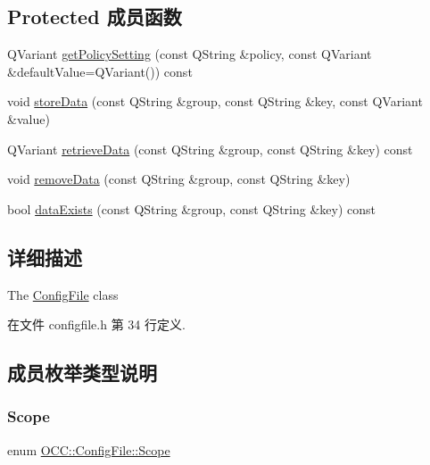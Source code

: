 \subsection*{Protected 成员函数}
\begin{DoxyCompactItemize}
\item 
Q\+Variant \hyperlink{class_o_c_c_1_1_config_file_ab8458ef4cde677e7d08c95291a15c00d}{get\+Policy\+Setting} (const Q\+String \&policy, const Q\+Variant \&default\+Value=Q\+Variant()) const
\item 
void \hyperlink{class_o_c_c_1_1_config_file_a0e1558affc0349e785270dfd04b49a89}{store\+Data} (const Q\+String \&group, const Q\+String \&key, const Q\+Variant \&value)
\item 
Q\+Variant \hyperlink{class_o_c_c_1_1_config_file_a578b6354af7268fcf3f552574d848cbd}{retrieve\+Data} (const Q\+String \&group, const Q\+String \&key) const
\item 
void \hyperlink{class_o_c_c_1_1_config_file_a24117f4ec9d4387901c0222478fe6584}{remove\+Data} (const Q\+String \&group, const Q\+String \&key)
\item 
bool \hyperlink{class_o_c_c_1_1_config_file_ae2c5b31e20035ccca6df56a83234d788}{data\+Exists} (const Q\+String \&group, const Q\+String \&key) const
\end{DoxyCompactItemize}


\subsection{详细描述}
The \hyperlink{class_o_c_c_1_1_config_file}{Config\+File} class 

在文件 configfile.\+h 第 34 行定义.



\subsection{成员枚举类型说明}
\mbox{\label{class_o_c_c_1_1_config_file_ab571084ce59ba92b0ce4079460b7c869}} 
\subsubsection{\texorpdfstring{Scope}{Scope}}
{\footnotesize\ttfamily enum \hyperlink{class_o_c_c_1_1_config_file_ab571084ce59ba92b0ce4079460b7c869}{O\+C\+C\+::\+Config\+File\+::\+Scope}}

